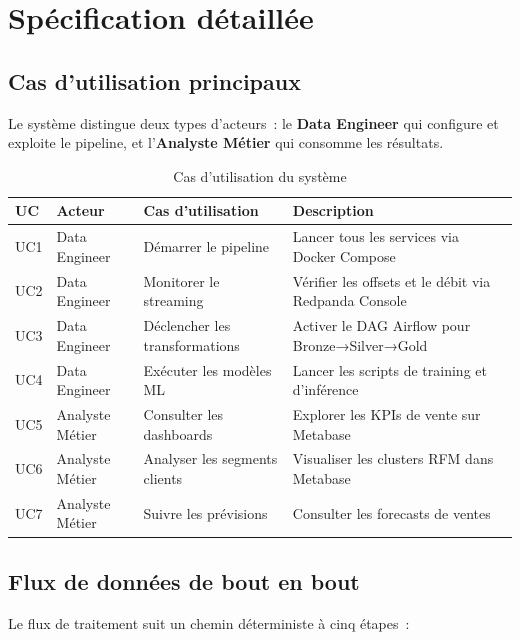 \section{Spécification détaillée}

\subsection{Cas d'utilisation principaux}

Le système distingue deux types d'acteurs~: le \textbf{Data Engineer} qui configure et exploite le pipeline, et l'\textbf{Analyste Métier} qui consomme les résultats.

\begin{table}[H]
\centering
\begin{tabular}{p{1cm} p{3.5cm} p{4cm} p{5cm}}
\toprule
\textbf{UC} & \textbf{Acteur} & \textbf{Cas d'utilisation} & \textbf{Description} \\
\midrule
UC1 & Data Engineer & Démarrer le pipeline & Lancer tous les services via Docker Compose \\
UC2 & Data Engineer & Monitorer le streaming & Vérifier les offsets et le débit via Redpanda Console \\
UC3 & Data Engineer & Déclencher les transformations & Activer le DAG Airflow pour Bronze→Silver→Gold \\
UC4 & Data Engineer & Exécuter les modèles ML & Lancer les scripts de training et d'inférence \\
UC5 & Analyste Métier & Consulter les dashboards & Explorer les KPIs de vente sur Metabase \\
UC6 & Analyste Métier & Analyser les segments clients & Visualiser les clusters RFM dans Metabase \\
UC7 & Analyste Métier & Suivre les prévisions & Consulter les forecasts de ventes \\
\bottomrule
\end{tabular}
\caption{Cas d'utilisation du système}
\end{table}

\subsection{Flux de données de bout en bout}

Le flux de traitement suit un chemin déterministe à cinq étapes~:

